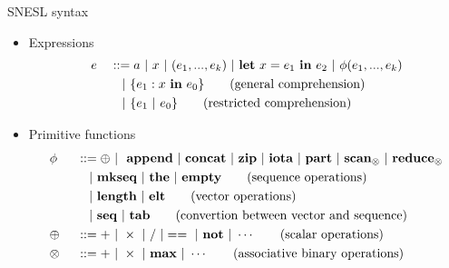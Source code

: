 \documentclass{beamer}
\begin{document}
\begin{frame}{SNESL syntax} 
	\begin{itemize}
		\item Expressions
		\begin{alignat*}{2}
		& e &&::=  a \ | \ x \ | \ (e_1,...,e_k) \ | \ \Let{x}{e_1}{e_2} \ | \ \hcall{\Tupk{e}} \\ 
		&   && \quad | \ \{e_1:  x \ \*{in} \ e_0 \} \tag{general comprehension} \\
		&   && \quad | \ \{e_1 \ | \ e_0 \}\tag {restricted comprehension} 
		\end{alignat*}
		
  \item Primitive functions
		\begin{alignat*}{2} 
		&\hcall && ::= \oplus \ | \ \ \*{append} \ | \ \*{concat} \ | \ \*{zip} \ | \ \*{iota}  \ | \ \*{part}  \ | \ \*{scan}_{\otimes} \ | \ \*{reduce}_{\otimes}   \\
		&   && \quad | \ \*{mkseq} \ |  \ \*{the}  \ | \ \*{empty} \tag{sequence operations}\\
		&   && \quad | \ \*{length} \ | \ \*{elt}  \tag{vector operations}\\
		&   && \quad | \ \*{seq} \ | \ \*{tab} \tag{convertion between vector and sequence}\\
		& \oplus  \ && :: = +  \ | \ \times \ |  \  / \ | ==  \ | \ \*{not} \ | \ \cdots  \tag{scalar operations}\\
		& \otimes \ && :: = + \ | \ \times  \ | \ \*{max} \ | \ \cdots  \tag{associative binary operations}
		\end{alignat*}
	\end{itemize}
\end{frame}
\end{document}
